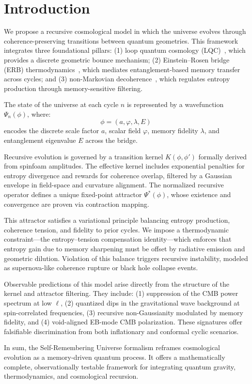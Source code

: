 \section{Introduction}
\label{sec:Intro}

We propose a recursive cosmological model in which the universe evolves through coherence-preserving transitions between quantum geometries. This framework integrates three foundational pillars: (1) loop quantum cosmology (LQC)~\cite{ashtekar2006quantum}, which provides a discrete geometric bounce mechanism; (2) Einstein–Rosen bridge (ERB) thermodynamics~\cite{maldacena2013cool}, which mediates entanglement-based memory transfer across cycles; and (3) non-Markovian decoherence~\cite{breuer2002theory}, which regulates entropy production through memory-sensitive filtering.

The state of the universe at each cycle \( n \) is represented by a wavefunction \( \Psi_n(\phi) \), where:
\[
\phi = (a, \varphi, \lambda, E)
\]
encodes the discrete scale factor \( a \), scalar field \( \varphi \), memory fidelity \( \lambda \), and entanglement eigenvalue \( E \) across the bridge.

Recursive evolution is governed by a transition kernel \( K(\phi, \phi') \) formally derived from spinfoam amplitudes. The effective kernel includes exponential penalties for entropy divergence and rewards for coherence overlap, filtered by a Gaussian envelope in field-space and curvature alignment. The normalized recursive operator defines a unique fixed-point attractor \( \Psi^*(\phi) \), whose existence and convergence are proven via contraction mapping.

This attractor satisfies a variational principle balancing entropy production, coherence tension, and fidelity to prior cycles. We impose a thermodynamic constraint—the entropy–tension compensation identity—which enforces that entropy gain due to memory sharpening must be offset by radiative emission and geometric dilution. Violation of this balance triggers recursive instability, modeled as supernova-like coherence rupture or black hole collapse events.

Observable predictions of this model arise directly from the structure of the kernel and attractor filtering. They include: (1) suppression of the CMB power spectrum at low \( \ell \), (2) quantized dips in the gravitational wave background at spin-correlated frequencies, (3) recursive non-Gaussianity modulated by memory fidelity, and (4) void-aligned EB-mode CMB polarization. These signatures offer falsifiable discrimination from both inflationary and conformal cyclic scenarios.

In sum, the Self-Remembering Universe formalism reframes cosmological evolution as a memory-driven quantum process. It offers a mathematically complete, observationally testable framework for integrating quantum gravity, thermodynamics, and cosmological recursion.
